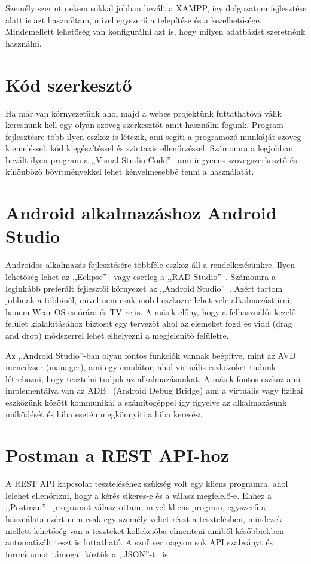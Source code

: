 \documentclass[
]{thesis-ekf}
\theoremstyle{definition}
\theoremstyle{remark}
\begin{document}
	Személy szerint nekem sokkal jobban bevált a XAMPP, így dolgozatom fejlesztése alatt is azt használtam, mivel egyszerű a telepítése és a kezelhetősége. Mindemellett lehetőség van konfigurálni azt is, hogy milyen adatbázist szeretnénk használni. 
	
	\section{Kód szerkesztő}
	Ha már van környezetünk ahol majd a webes projektünk futtathatóvá válik keresnünk kell egy olyan szöveg szerkesztőt amit használni fogunk. Program fejlesztésre több ilyen eszköz is létezik, ami segíti a programozó munkáját szöveg kiemeléssel, kód kiegészítéssel és szintaxis ellenőrzéssel. Számomra a legjobban bevált ilyen program a ,,Visual Studio Code''~\cite{vsc_doc} ami ingyenes szövegszerkesztő és különböző bővítményekkel lehet kényelmesebbé tenni a használatát.
	
	\section{Android alkalmazáshoz Android Studio}
	Androidos alkalmazás fejlesztésére többféle eszköz áll a rendelkezésünkre. Ilyen lehetőség lehet az ,,Eclipse''~\cite{eclipse_doc} vagy esetleg a ,,RAD Studio''~\cite{rad_doc}. Számomra a leginkább preferált fejlesztői környezet az ,,Android Studio''~\cite{androidStudio_doc}. Azért tartom jobbnak a többinél, mivel nem csak mobil eszközre lehet vele alkalmazást írni, hanem Wear OS-es órára és TV-re is. A másik előny, hogy a felhasználói kezelő felület kialakításához biztosít egy tervezőt ahol az elemeket fogd és vidd (drag and drop) módszerrel lehet elhelyezni a megjelenítő felületre. 
	
	Az ,,Android Studio''-ban olyan fontos funkciók vannak beépítve, mint az AVD~\cite{androidStudioAvd_doc} menedzser (manager), ami egy emulátor, ahol virtuális eszközöket tudunk létrehozni, hogy tesztelni tudjuk az alkalmazásunkat. A másik fontos eszköz ami implementálva van az ADB~\cite{androidStudioAdb_doc} (Android Debug Bridge) ami a virtuális vagy fizikai eszközünk között kommunikál a számítógéppel így figyelve az alkalmazásunk működését és hiba esetén megkönnyíti a hiba keresést. 
	
	\section{Postman a REST API-hoz}
	A REST API kapcsolat teszteléséhez szükség volt egy kliens programra, ahol lelehet ellenőrizni, hogy a kérés sikeres-e és a válasz megfelelő-e. Ehhez a ,,Postman''~\cite{postman_doc} programot választottam, mivel kliens program, egyszerű a használata ezért nem csak egy személy vehet részt a tesztelésben, mindezek mellett lehetőség van a teszteket kollekcióba elmenteni amiből későbbiekben automatizált teszt is futtatható. A szoftver nagyon sok API szabványt és formátumot támogat köztük a ,,JSON''-t~\cite{json_doc} is.
	
\end{document}
